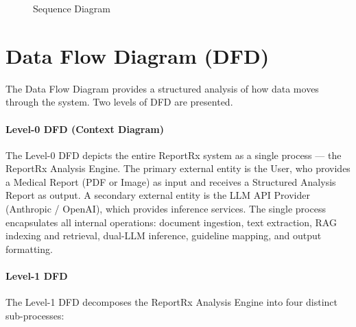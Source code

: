 \documentclass[12pt,a4paper]{report}
\begin{document}
\begin{figure}[h]
    \centering
    \caption{Sequence Diagram}
\end{figure}

\section{Data Flow Diagram (DFD)}
The Data Flow Diagram provides a structured analysis of how data moves through the system. Two levels of DFD are presented.

\paragraph{Level-0 DFD (Context Diagram)}
The Level-0 DFD depicts the entire ReportRx system as a single process --- the ReportRx Analysis Engine. The primary external entity is the User, who provides a Medical Report (PDF or Image) as input and receives a Structured Analysis Report as output. A secondary external entity is the LLM API Provider (Anthropic / OpenAI), which provides inference services. The single process encapsulates all internal operations: document ingestion, text extraction, RAG indexing and retrieval, dual-LLM inference, guideline mapping, and output formatting.

\paragraph{Level-1 DFD}
The Level-1 DFD decomposes the ReportRx Analysis Engine into four distinct sub-processes:
\end{document}
